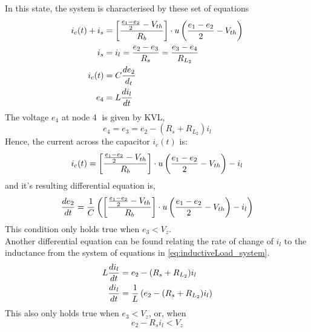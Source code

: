 In this state, the system is characterised by these set of equations
\begin{align}
	i_c(t) + i_s &= \left[\frac{\frac{e_1 - e_2}{2} - V_{th}}{R_b} \right]\cdot u\left(\frac{e_1 - e_2}{2} - V_{th} \right) \\
	i_s &= i_l = \frac{e_2 - e_3}{R_s} = \frac{e_3 - e_4}{R_{L_2}} \\
	i_c(t) &= C \frac{de_2}{d_t} \\
	e_4 &= L\frac{di_l}{dt}
	\label{eq:inductiveLoad_system}
\end{align}
The voltage $e_4$ at node \textcircled{4} is given by KVL,
\begin{equation}
	e_4 = e_3 = e_2 - (R_s + R_{L_2})i_l
\end{equation}
Hence, the current across the capacitor $i_c(t)$ is:
\begin{equation}
	i_c(t) = \left[\frac{\frac{e_1 - e_2}{2} - V_{th}}{R_b} \right]\cdot u\left(\frac{e_1 - e_2}{2} - V_{th} \right) - i_l
\end{equation}
and it's resulting differential equation is,
\begin{equation}
	\frac{de_2}{dt} = \frac{1}{C}\left(\left[\frac{\frac{e_1 - e_2}{2} - V_{th}}{R_b} \right]\cdot u\left(\frac{e_1 - e_2}{2} - V_{th} \right) - i_l \right)
	\label{eq:inductiveLoad_DiffEq1}
\end{equation}
This condition only holds true when $e_3 < V_z$.
\\

Another differential equation can be found relating the rate of change of $i_l$ to the inductance from the system of equations in \eqref{eq:inductiveLoad_system}.
\begin{equation}
	\begin{split}
		L\frac{di_l}{dt} &= e_2 - (R_s + R_{L_2})i_l \\
		 \frac{di_l}{dt} &= \frac{1}{L}\left(e_2 - (R_s + R_{L_2})i_l \right)
	\end{split}
	\label{eq:inductiveLoad_DiffEq2}
\end{equation}
This also only holds true when $e_3 < V_z$, or, when
\begin{equation}
	e_2 - R_si_l < V_z
\end{equation}

